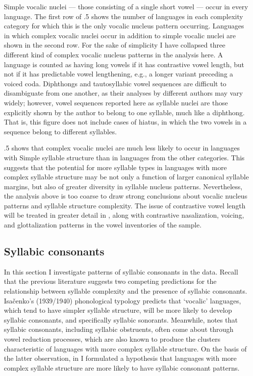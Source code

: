   Simple vocalic nuclei — those consisting of a single short vowel — occur in every language. The first row of .5 shows the number of languages in each complexity category for which this is the only vocalic nucleus pattern occurring. Languages in which complex vocalic nuclei occur in addition to simple vocalic nuclei are shown in the second row. For the sake of simplicity I have collapsed three different kind of complex vocalic nucleus patterns in the analysis here. A language is counted as having long vowels if it has contrastive vowel length, but not if it has predictable vowel lengthening, e.g., a longer variant preceding a voiced coda. Diphthongs and tautosyllabic vowel sequences are difficult to disambiguate from one another, as their analyses by different authors may vary widely; however, vowel sequences reported here as syllable nuclei are those explicitly shown by the author to belong to one syllable, much like a diphthong. That is, this figure does not include cases of hiatus, in which the two vowels in a sequence belong to different syllables.

  .5 shows that complex vocalic nuclei are much less likely to occur in languages with Simple syllable structure than in languages from the other categories. This suggests that the potential for more syllable types in languages with more complex syllable structure may be not only a function of larger canonical syllable margins, but also of greater diversity in syllable nucleus patterns. Nevertheless, the analysis above is too coarse to draw strong conclusions about vocalic nucleus patterns and syllable structure complexity. The issue of contrastive vowel length will be treated in greater detail in , along with contrastive nasalization, voicing, and glottalization patterns in the vowel inventories of the sample.

\subsection{Syllabic consonants}\label{sec:3.3.5}

  In this section I investigate patterns of syllabic consonants in the data. Recall that the previous literature suggests two competing predictions for the relationship between syllable complexity and the presence of syllabic consonants. Isačenko’s (1939/1940) phonological typology predicts that ‘vocalic’ languages, which tend to have simpler syllable structure, will be more likely to develop syllabic consonants, and specifically syllabic sonorants. Meanwhile, \citet{Bell1978a} notes that syllabic consonants, including syllabic obstruents, often come about through vowel reduction processes, which are also known to produce the clusters characteristic of languages with more complex syllable structure. On the basis of the latter observation, in  I formulated a hypothesis that languages with more complex syllable structure are more likely to have syllabic consonant patterns.

